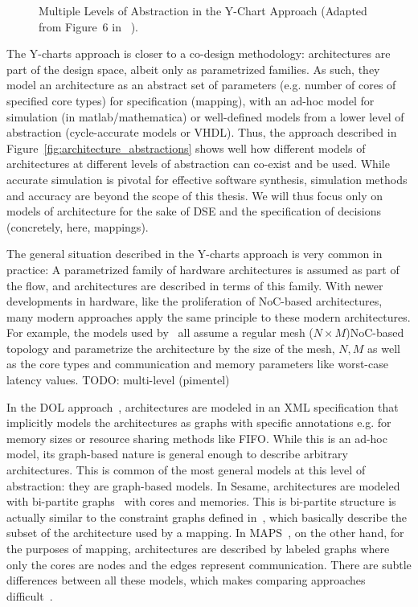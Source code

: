 \begin{figure}[h]
	\centering
\resizebox{0.8\textwidth}{!}{
   \begin{tikzpicture}
     
   \end{tikzpicture}
 }
   \caption{Multiple Levels of Abstraction in the Y-Chart Approach (Adapted from Figure~6 in ~\cite{kienhuis2001methodology}).}
   \label{fig:y_chart_abstractions}
\end{figure}

The Y-charts approach is closer to a co-design methodology: architectures are part of the design space, albeit only as parametrized families.
As such, they model an architecture as an abstract set of parameters (e.g. number of cores of specified core types) for specification (mapping), with an ad-hoc model for simulation (in matlab/mathematica) or well-defined models from a lower level of abstraction (cycle-accurate models or VHDL).
Thus, the approach described in Figure~\ref{fig:architecture_abstractions} shows well how different models of architectures at different levels of abstraction can co-exist and be used.
While accurate simulation is pivotal for effective software synthesis, simulation methods and accuracy are beyond the scope of this thesis.
We will thus focus only on models of architecture for the sake of \ac{DSE} and the specification of decisions (concretely, here, mappings).

The general situation described in the Y-charts approach is very common in practice: A parametrized family of hardware architectures is assumed as part of the flow, and architectures are described in terms of this family.
With newer developments in hardware, like the proliferation of \ac{NoC}-based architectures, many modern approaches apply the same principle to these modern architectures.
For example, the models used by~\cite{weichslgartner2014daarm,singh2010communication,richthammer2018search} all assume a regular mesh ($N \times M$)\ac{NoC}-based topology and parametrize the architecture by the size of the mesh, $N,M$ as well as the core types and communication and memory parameters like worst-case latency values.
TODO: multi-level (pimentel)

In the DOL approach~\cite{thiele2007DOL}, architectures are modeled in an XML specification that implicitly models the architectures as graphs with specific annotations e.g. for memory sizes or resource sharing methods like \ac{FIFO}. 
While this is an ad-hoc model, its graph-based nature is general enough to describe arbitrary architectures.
This is common of the most general models at this level of abstraction: they are graph-based models.
In Sesame, architectures are modeled with bi-partite graphs~\cite{erbas2006multiobjective} with cores and memories.
This is bi-partite structure is actually similar to the constraint graphs defined in~\cite{weichslgartner2014daarm,richthammer2018search}, which basically describe the subset of the architecture used by a mapping. 
In MAPS~\cite{maps}, on the other hand, for the purposes of mapping, architectures are described by labeled graphs where only the cores are nodes and the edges represent communication.
There are subtle differences between all these models, which makes comparing approaches difficult~\cite{goens_mcsoc16}.

